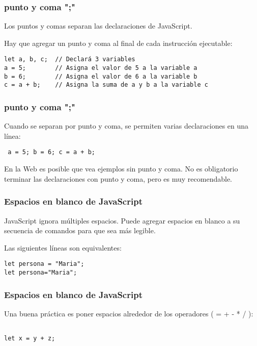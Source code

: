 \begin{frame}[fragile]
  \frametitle{punto y coma ";"}

  Los puntos y comas separan las declaraciones de JavaScript.

  \vspace{\baselineskip}
  Hay que agregar un punto y coma al final de cada instrucción ejecutable: 

  \vspace{\baselineskip}
  \begin{lstlisting}
let a, b, c;  // Declará 3 variables
a = 5;        // Asigna el valor de 5 a la variable a
b = 6;        // Asigna el valor de 6 a la variable b
c = a + b;    // Asigna la suma de a y b a la variable c
  \end{lstlisting}
\end{frame}

\begin{frame}[fragile]
  \frametitle{punto y coma ";"}

  Cuando se separan por punto y coma,
  se permiten varias declaraciones en una línea:

  \vspace{\baselineskip}
  \begin{lstlisting}
 a = 5; b = 6; c = a + b;
  \end{lstlisting}

  \begin{block}{En la Web}
    es posible que vea ejemplos sin punto y coma.
    No es obligatorio terminar las declaraciones con punto y coma,
    pero es muy recomendable. 
  \end{block}
\end{frame}

\begin{frame}[fragile]
  \frametitle{Espacios en blanco de JavaScript}

  JavaScript ignora múltiples espacios. Puede agregar espacios
  en blanco a su secuencia de comandos para que sea más legible.

  \vspace{\baselineskip}
  Las siguientes líneas son equivalentes: 

  \vspace{\baselineskip}
  \begin{lstlisting}
let persona = "Maria";
let persona="Maria";
  \end{lstlisting}
\end{frame}

\begin{frame}[fragile]
  \frametitle{Espacios en blanco de JavaScript}

  Una buena práctica es poner espacios alrededor
  de los operadores ( = + - * / ): 

  \vspace{\baselineskip}
  \begin{lstlisting}

let x = y + z;

  \end{lstlisting}
\end{frame}

